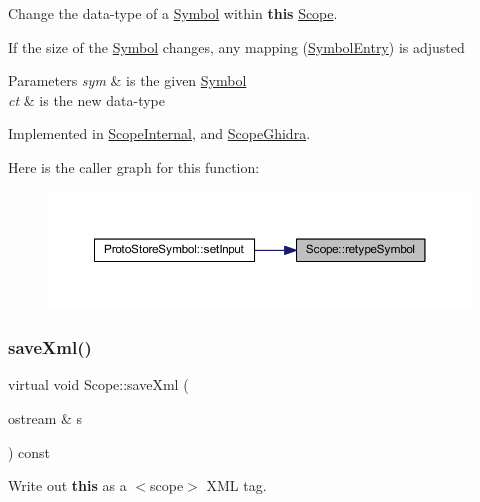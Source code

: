 Change the data-\/type of a \mbox{\hyperlink{class_symbol}{Symbol}} within {\bfseries{this}} \mbox{\hyperlink{class_scope}{Scope}}. 

If the size of the \mbox{\hyperlink{class_symbol}{Symbol}} changes, any mapping (\mbox{\hyperlink{class_symbol_entry}{Symbol\+Entry}}) is adjusted 
\begin{DoxyParams}{Parameters}
{\em sym} & is the given \mbox{\hyperlink{class_symbol}{Symbol}} \\
\hline
{\em ct} & is the new data-\/type \\
\hline
\end{DoxyParams}


Implemented in \mbox{\hyperlink{class_scope_internal_a9711a8084e1ac5c4417a4452c96a36b7}{Scope\+Internal}}, and \mbox{\hyperlink{class_scope_ghidra_a086054a08a1916c410fa10b3e8afca76}{Scope\+Ghidra}}.

Here is the caller graph for this function\+:
\nopagebreak
\begin{figure}[H]
\begin{center}
\leavevmode
\includegraphics[width=350pt]{class_scope_afeef6a133b07fa176c08b67c44064e69_icgraph}
\end{center}
\end{figure}
\mbox{\label{class_scope_a2583da1be37d68197dfbb0445fa1f3e0}} 
\subsubsection{\texorpdfstring{saveXml()}{saveXml()}}
{\footnotesize\ttfamily virtual void Scope\+::save\+Xml (\begin{DoxyParamCaption}\item[{ostream \&}]{s }\end{DoxyParamCaption}) const\hspace{0.3cm}{\ttfamily [pure virtual]}}



Write out {\bfseries{this}} as a $<$scope$>$ X\+ML tag. 



